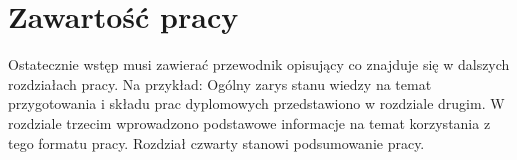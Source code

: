 \section{Zawartość pracy}
\label{sec:wstep:zawartosc}
	
	Ostatecznie wstęp musi zawierać przewodnik opisujący co znajduje się w dalszych rozdziałach pracy. Na przykład:
	Ogólny zarys stanu wiedzy na temat przygotowania i składu prac dyplomowych przedstawiono w rozdziale drugim. W rozdziale trzecim wprowadzono podstawowe informacje na temat korzystania z tego formatu pracy. Rozdział czwarty stanowi podsumowanie pracy.
